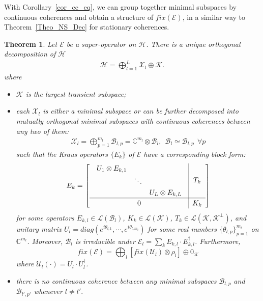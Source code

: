 \documentclass[journal]{IEEEtran}
\def\h{\ensuremath{\mathcal{H}}}
\def\l{\ensuremath{\mathcal{L}}}
\def\u{\ensuremath{\mathcal{U}}}
\def\k{\ensuremath{\mathcal{K}}}
\def\u{\ensuremath{\mathcal{U}}}
\def\x{\ensuremath{\mathcal{X}}}
\def\b{\ensuremath{\mathcal{B}}}
\def\e{\ensuremath{\mathcal{E}}}
\def\l{\ensuremath{\mathcal{L}}}
\def\l{\mathcal{L}}
\def\k{\mathcal{K}}
\newtheorem{theorem}{Theorem}
\begin{document}
With Corollary~\ref{cor_cc_eq}, we can group together minimal subspaces by continuous coherences and obtain a structure of $fix(\e)$, in a similar way to Theorem~\ref{Theo_NS_Dec} for stationary coherences. 

\begin{theorem}\label{Theo_CC_dec}
  Let $\e$ be a super-operator on $\h$. There is a unique  orthogonal decomposition of $\h$
  \begin{eqnarray}\label{Eq_unique}
    \h=\bigoplus_{l=1}^{L}\x_l\oplus \k.
  \end{eqnarray}
  where \begin{itemize}
    \item[(1)] $\k$ is the largest transient subspace;
    \item[(2)] each $\x_l$ is either a minimal subspace or can be further decomposed into mutually orthogonal minimal subspaces with continuous coherences between any two of them:
    \begin{eqnarray}\label{Eq_dec_CC}
      \x_l=\bigoplus_{p=1}^{m_l}\b_{l,p}=\mathbb{C}^{m_l}\otimes \b_l,  \ \ \b_l\simeq \b_{l,p} \ \ \forall p
    \end{eqnarray}  such that  the Kraus operators $\{E_k\}$ of $\e$ have a corresponding block form:
      \begin{eqnarray}\label{Eq_CC_dec_Kraus}
    \renewcommand{\arraystretch}{1.2}
E_k=\left[\begin{array}{c|c}
  \begin{array}{ccc}
  U_{1}\otimes E_{k,1} &  &\\
   & \ddots &\\
   & & U_{L}\otimes E_{k,L}  
  \end{array} & T_k\\
  \hline
0&K_k
\end{array}\right]
  \end{eqnarray}
for some operators $E_{k,l}\in \l(\b_l)$, $K_k\in \l(\k)$, $T_k\in\l(\k,\k^\perp)$, and    unitary matrix $U_l=diag(e^{i\theta_{l,1}},\cdots,e^{i\theta_{l,m_l}})$ for some real numbers $\{\theta_{l,p}\}_{p=1}^{m_l}$ on $\mathbb{C}^{m_l}$. Moreover, $\b_l$ is irreducible under $\e_{l}=\sum_{k}E_{k,l}\cdot E_{k,l}^\dagger$. 
 Furthermore, 
$$fix(\e)=\bigoplus_l[fix(\u_{l})\otimes \rho_l]\oplus 0_\k$$ 
where $\u_l(\cdot)=U_l\cdot U_l^\dagger$. 

    \item[(3)] there is no continuous coherence between any minimal subspaces $\b_{l, p}$ and $\b_{l', p'}$ whenever $l\neq l'.$ 
      \end{itemize}
\end{theorem}
\end{document}
